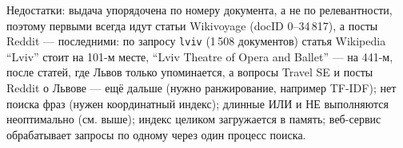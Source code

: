 Недостатки: выдача упорядочена по номеру документа, а не по релевантности, поэтому первыми всегда идут статьи Wikivoyage (docID 0--34\,817), а посты Reddit --- последними: по запросу \texttt{lviv} (1\,508 документов) статья Wikipedia \enquote{Lviv} стоит на 101-м месте, \enquote{Lviv Theatre of Opera and Ballet} --- на 441-м, после статей, где Львов только упоминается, а вопросы Travel SE и посты Reddit о Львове --- ещё дальше (нужно ранжирование, например TF-IDF); нет поиска фраз (нужен координатный индекс); длинные ИЛИ и НЕ выполняются неоптимально (см. выше); индекс целиком загружается в память; веб-сервис обрабатывает запросы по одному через один процесс поиска.
